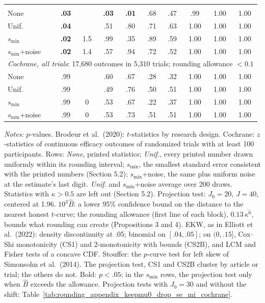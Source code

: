 \begin{table}[htbp]
{\begin{tabular}{lccccccccc}
\addlinespace
\multicolumn{10}{l}{\textit{RDD}: 2,775 $t$-statistics in 80 articles; rounding allowance $<0.1$} \\
None & \textbf{.03} &  & \textbf{.03} & \textbf{.01} & .68 & .47 & .99 & 1.00 & 1.00 \\
Unif. & \textbf{.04} &  & .51 & .80 & .71 & .63 & 1.00 & 1.00 & 1.00 \\
$s_{\min}$ & \textbf{.02} & 1.5 & .99 & .35 & .89 & .59 & 1.00 & 1.00 & 1.00 \\
$s_{\min}$+noise & \textbf{.02} & 1.4 & .57 & .94 & .72 & .52 & 1.00 & 1.00 & 1.00 \\
\midrule
\multicolumn{10}{l}{\textit{Cochrane, all trials}: 17,680 outcomes in 5,310 trials; rounding allowance $<0.1$} \\
None & .99 &  & .60 & .67 & .28 & .32 & 1.00 & 1.00 & 1.00 \\
Unif. & .99 &  & .49 & .76 & .50 & .51 & 1.00 & 1.00 & 1.00 \\
$s_{\min}$ & .99 & 0 & .53 & .67 & .22 & .37 & 1.00 & 1.00 & 1.00 \\
$s_{\min}$+noise & .99 & 0 & .53 & .73 & .51 & .51 & 1.00 & 1.00 & 1.00 \\
\bottomrule
\end{tabular}}

\medskip
\begin{minipage}{\linewidth}
\footnotesize
\textit{Notes:} $p$-values. Brodeur et al.\ (2020): $t$-statistics by research design. Cochrane: $z$-statistics of continuous efficacy outcomes of randomized trials with at least 100 participants.
Rows: \textit{None}, printed statistics; \textit{Unif.}, every printed number drawn uniformly within its rounding interval; $s_{\min}$, the smallest standard error consistent with the printed numbers (Section 5.2); $s_{\min}$+noise, the same plus uniform noise at the estimate's last digit. \textit{Unif.} and $s_{\min}$+noise average over 200 draws.
Statistics with $\kappa>0.5$ are left out (Section 5.2).
Projection test: $J_0=20$, $J=40$, centered at 1.96. $10^3\widehat{B}$: a lower 95\% confidence bound on the distance to the nearest honest $t$-curve; the rounding allowance (first line of each block), $0.13\,\overline{\kappa^6}$, bounds what rounding can create (Propositions 3 and 4).
EKW, as in Elliott et al.\ (2022): density discontinuity at .05; binomial on $[.04,.05]$; on $(0,.15]$, Cox--Shi monotonicity (CS1) and 2-monotonicity with bounds (CS2B), and LCM and Fisher tests of a concave CDF.
Stouffer: the $p$-curve test for left skew of Simonsohn et al.\ (2014).
The projection test, CS1 and CS2B cluster by article or trial; the others do not.
Bold: $p<.05$; in the $s_{\min}$ rows, the projection test only when $\widehat{B}$ exceeds the allowance.
Projection tests with $J_0=30$ and without the shift: Table~\ref{tab:rounding_appendix_keepmu0_drop_se_mi_cochrane}.
\end{minipage}
\end{table}
